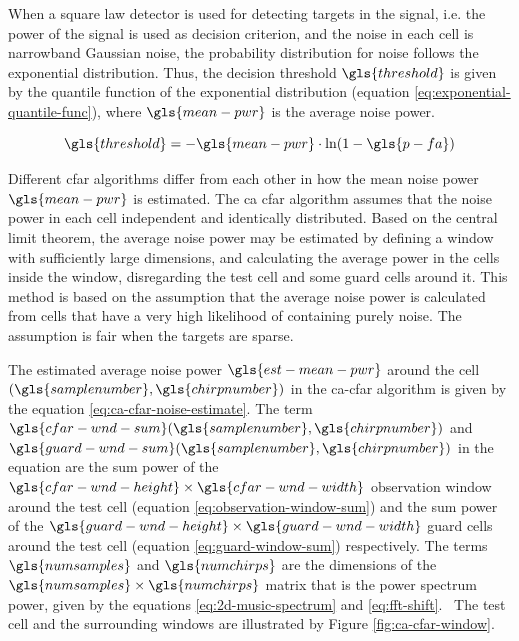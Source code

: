 When a square law detector is used for detecting targets in the signal,
i.e. the power of the signal is used as decision criterion,
and the noise in each cell is narrowband Gaussian noise,
the probability distribution for noise follows the exponential distribution.
Thus, the decision threshold $\gls{threshold}$ is given by the quantile function of the exponential distribution (equation \ref{eq:exponential-quantile-func}),
where $\gls{mean-pwr}$ is the average noise power.~\cite{mean-level-detection}

\begin{equation}
    \label{eq:exponential-quantile-func}
    \gls{threshold} = -\gls{mean-pwr} \cdot \ln( 1-\gls{p-fa} )
\end{equation}

Different \gls{cfar} algorithms differ from each other in how the mean noise power $\gls{mean-pwr}$ is estimated.
The \gls{ca} \gls{cfar} algorithm assumes that the noise power in each cell independent and identically distributed.
Based on the central limit theorem, the average noise power may be estimated by defining a window with sufficiently large dimensions,
and calculating the average power in the cells inside the window, disregarding the test cell and some guard cells around it.
This method is based on the assumption that the average noise power is calculated from cells that have a very high likelihood of containing purely noise.
The assumption is fair when the targets are sparse.

The estimated average noise power $\gls{est-mean-pwr}$ around the cell $(\gls{samplenumber}, \gls{chirpnumber})$
in the \gls{ca}-\gls{cfar} algorithm is given by the equation \ref{eq:ca-cfar-noise-estimate}.
The term $\gls{cfar-wnd-sum}(\gls{samplenumber}, \gls{chirpnumber})$ and $\gls{guard-wnd-sum}(\gls{samplenumber}, \gls{chirpnumber})$ in the equation are the sum power of the $\gls{cfar-wnd-height} \times \gls{cfar-wnd-width}$
observation window around the test cell (equation \ref{eq:observation-window-sum})
and the sum power of the $\gls{guard-wnd-height} \times \gls{guard-wnd-width}$ guard cells around the test cell
(equation \ref{eq:guard-window-sum}) respectively.
The terms $\gls{numsamples}$ and $\gls{numchirps}$ are the dimensions of the $\gls{numsamples} \times \gls{numchirps}$ matrix that is the power spectrum \gls{power},
given by the equations \ref{eq:2d-music-spectrum} and \ref{eq:fft-shift}.~\cite{fast-two-dimensional-cfar}
The test cell and the surrounding windows are illustrated by Figure \ref{fig:ca-cfar-window}.

